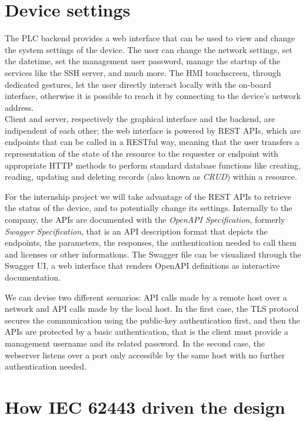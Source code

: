 \section{Device settings}

The PLC backend provides a web interface that can be used to view and change the system settings of the device. The user can change the network settings, set the datetime, set the management user password, manage the startup of the services like the SSH server, and much more. The HMI touchscreen, through dedicated gestures, let the user directly interact locally with the on-board interface, otherwise it is possible to reach it by connecting to the device's network address. \\
Client and server, respectively the graphical interface and the backend, are indipendent of each other; the web interface is powered by REST APIs, which are endpoints that can be called in a RESTful way, meaning that the user transfers a representation of the state of the resource to the requester or endpoint with appropriate HTTP methods to perform standard database functions like creating, reading, updating and deleting records (also known as \textit{CRUD}) within a resource.~\cite{rest-api}

For the internship project we will take advantage of the REST APIs to retrieve the status of the device, and to potentially change its settings. Internally to the company, the APIs are documented with the \textit{OpenAPI Specification}, formerly \textit{Swagger Specification}, that is an API description format that depicts the endpoints, the parameters, the responses, the authentication needed to call them and licenses or other informations. The Swagger file can be visualized through the Swagger UI, a web interface that renders OpenAPI definitions as interactive documentation.~\cite{openapi-swagger}

We can devise two different scenarios: API calls made by a remote host over a network and API calls made by the local host. In the first case, the TLS protocol secures the communication using the public-key authentication first, and then the APIs are protected by a basic authentication, that is the client must provide a management username and its related password. In the second case, the webserver listens over a port only accessible by the same host with no further authentication needed.

\section{How IEC 62443 driven the design}

